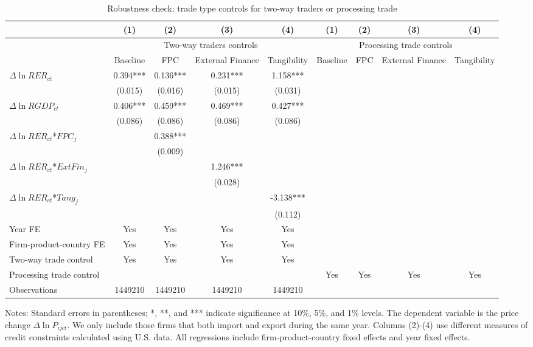 \documentclass[12pt]{article}
\begin{document}
\begin{table}
	\centering
	\caption{Robustness check: trade type controls for two-way traders or processing trade}
	\begin{threeparttable}
		\begin{tabular}{lcccccccc}
			\toprule
			& (1)   & (2)   & (3)   & (4) & (1)   & (2)   & (3)   & (4)\\
			\midrule
			& \multicolumn{4}{c}{Two-way traders controls} & \multicolumn{4}{c}{Processing trade controls}\\
			& Baseline & FPC   & External Finance & Tangibility & Baseline & FPC   & External Finance & Tangibility\\
			\midrule
			$\Delta \ln RER_{ct}$ & 0.394*** & 0.136*** & 0.231*** & 1.158*** &&&&\\
			& (0.015) & (0.016) & (0.015) & (0.031) &&&&\\
			$\Delta \ln RGDP_{ct}$ & 0.406*** & 0.459*** & 0.469*** & 0.427*** &&&&\\
			& (0.086) & (0.086) & (0.086) & (0.086) &&&&\\
			$\Delta \ln RER_{ct}$*$FPC_{j}$ &       & 0.388*** &       &  &&&&\\
			&       & (0.009) &       &  &&&&\\
			$\Delta \ln RER_{ct}$*$ExtFin_{j}$ &       &       & 1.246*** &  &&&&\\
			&       &       & (0.028) &  &&&&\\
			$\Delta \ln RER_{ct}$*$Tang_{j}$ &       &       &       & -3.138*** &&&&\\
			&       &       &       & (0.112) &&&&\\
			Year FE  &  Yes   & Yes   & Yes   & Yes &&&&\\
			Firm-product-country FE &  Yes   & Yes   & Yes   & Yes &&&&\\
			Two-way trade control &  Yes   & Yes   & Yes   & Yes &&&&\\
			Processing trade control &&&& &  Yes   & Yes   & Yes   & Yes \\
			Observations & 1449210 & 1449210 & 1449210 & 1449210 &&&&\\
			\bottomrule
		\end{tabular}
		\begin{tablenotes}
			\footnotesize
			\item[Notes:] Standard errors in parentheses; *, **, and *** indicate significance at 10\%, 5\%, and 1\% levels. The dependent variable is the price change $\Delta \ln P_{ijct}$. We only include those firms that both import and export during the same year. Columns (2)-(4) use different measures of credit constraints calculated using U.S. data. All regressions include firm-product-country fixed effects and year fixed effects.
		\end{tablenotes}
	\end{threeparttable}
	\label{tab.robust.tradetype}
\end{table}
\end{document}
